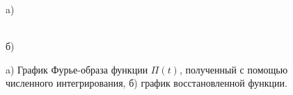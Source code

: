 \documentclass[a5paper, 10pt]{article}
\theoremstyle{definition}
\theoremstyle{plain}
\theoremstyle{remark}
\begin{document}
\begin{figure}[h!]
\begin{minipage}[h!]{0.5\linewidth}
 a) \\
\end{minipage}
\hfill
\begin{minipage}[h!]{0.5\linewidth}
 \\б)
\end{minipage}
\caption{a) График Фурье-образа функции $\Pi(t)$, полученный с помощью численного интегрирования, б) график восстановленной функции.}
\end{figure}
\end{document}

